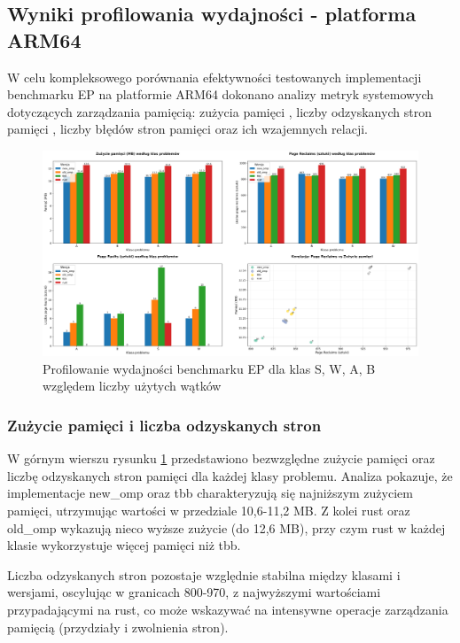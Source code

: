 \subsection{Wyniki profilowania wydajności - platforma ARM64}
W celu kompleksowego porównania efektywności testowanych implementacji benchmarku EP na platformie ARM64 dokonano analizy metryk systemowych dotyczących zarządzania pamięcią: zużycia pamięci , liczby odzyskanych stron pamięci , liczby błędów stron pamięci  oraz ich wzajemnych relacji.
\begin{figure}[H]
    \centering
    \includegraphics[width=\textwidth]{analiza/images/parallel/ep/chart_01_memory_comparison.png}
    \caption{Profilowanie wydajności benchmarku EP dla klas S, W, A, B względem liczby użytych wątków}
    \label{ep_porownanie_zuzycia_pamieci}
\end{figure}
 
\subsubsection{Zużycie pamięci i  liczba odzyskanych stron}
W górnym wierszu rysunku \ref{ep_porownanie_zuzycia_pamieci} przedstawiono bezwzględne zużycie pamięci oraz liczbę odzyskanych stron pamięci dla każdej klasy problemu. Analiza pokazuje, że implementacje new\_omp oraz tbb charakteryzują się najniższym zużyciem pamięci, utrzymując wartości w przedziale 10,6-11,2 MB. Z kolei rust oraz old\_omp wykazują nieco wyższe zużycie (do 12,6 MB), przy czym rust w każdej klasie wykorzystuje więcej pamięci niż tbb.

Liczba odzyskanych stron pozostaje względnie stabilna między klasami i wersjami, oscylując w granicach 800-970, z najwyższymi wartościami przypadającymi na rust, co może wskazywać na intensywne operacje zarządzania pamięcią (przydziały i zwolnienia stron).

